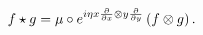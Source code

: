 \begin{equation}
f\star g=\mu \circ e^{i\eta x\frac{\partial }{\partial x}\otimes y\frac{%
\partial }{\partial y}}\left( f\otimes g\right) . 
\end{equation}

